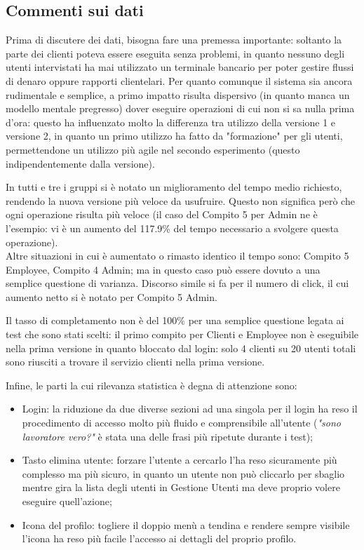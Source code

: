 \clearpage
\subsection{Commenti sui dati}
Prima di discutere dei dati, bisogna fare una premessa importante: soltanto la parte dei clienti poteva essere eseguita senza problemi, in quanto nessuno degli utenti intervistati ha mai utilizzato un terminale bancario per poter gestire flussi di denaro oppure rapporti clientelari. Per quanto comunque il sistema sia ancora rudimentale e semplice, a primo impatto risulta dispersivo (in quanto manca un modello mentale pregresso) dover eseguire operazioni di cui non si sa nulla prima d'ora: questo ha influenzato molto la differenza tra utilizzo della versione 1 e versione 2, in quanto un primo utilizzo ha fatto da "formazione" per gli utenti, permettendone un utilizzo più agile nel secondo esperimento (questo indipendentemente dalla versione).

\noindent
In tutti e tre i gruppi si è notato un miglioramento del tempo medio richiesto, rendendo la nuova versione più veloce da usufruire. Questo non significa però che ogni operazione risulta più veloce (il caso del Compito 5 per Admin ne è l'esempio: vi è un aumento del 117.9\% del tempo necessario a svolgere questa operazione).\\
Altre situazioni in cui è aumentato o rimasto identico il tempo sono: Compito 5 Employee, Compito 4 Admin; ma in questo caso può essere dovuto a una semplice questione di varianza. Discorso simile si fa per il numero di click, il cui aumento netto si è notato per Compito 5 Admin. 

\noindent
Il tasso di completamento non è del 100\% per una semplice questione legata ai test che sono stati scelti: il primo compito per Clienti e Employee non è eseguibile nella prima versione in quanto bloccato dal login: solo 4 clienti su 20 utenti totali sono riusciti a trovare il servizio clienti nella prima versione.

\noindent
Infine, le parti la cui rilevanza statistica è degna di attenzione sono:
\begin{itemize}
	\item Login: la riduzione da due diverse sezioni ad una singola per il login ha reso il procedimento di accesso molto più fluido e comprensibile all'utente (\textit{"sono lavoratore vero?"} è stata una delle frasi più ripetute durante i test);
	\item Tasto elimina utente: forzare l'utente a cercarlo l'ha reso sicuramente più complesso ma più sicuro, in quanto un utente non può cliccarlo per sbaglio mentre gira la lista degli utenti in Gestione Utenti ma deve proprio volere eseguire quell'azione;
	\item Icona del profilo: togliere il doppio menù a tendina e rendere sempre visibile l'icona ha reso più facile l'accesso ai dettagli del proprio profilo.
\end{itemize}

